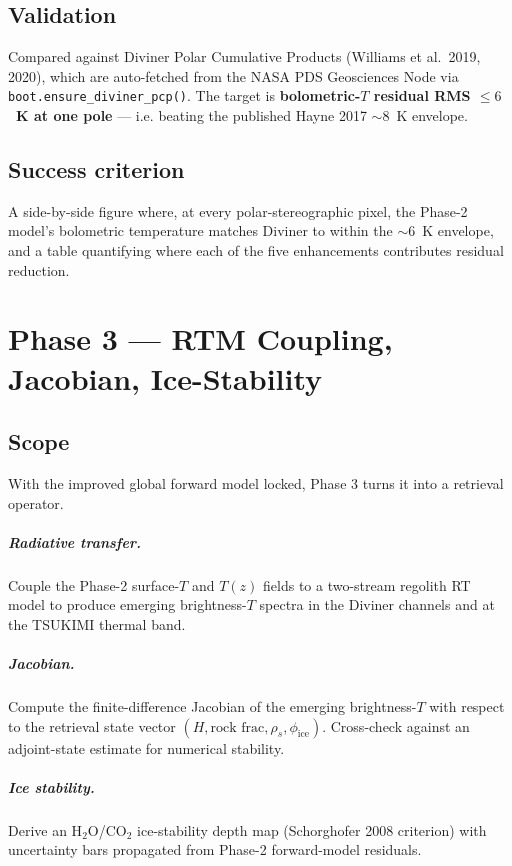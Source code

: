 \documentclass[11pt,a4paper]{book}
\begin{document}
\section{Validation}
Compared against Diviner Polar Cumulative Products (Williams
et al.\ 2019, 2020), which are auto-fetched from the NASA PDS Geosciences
Node via \texttt{boot.ensure\_diviner\_pcp()}. The target is
\textbf{bolometric-$T$ residual RMS $\le 6$~K at one pole} --- i.e.
beating the published Hayne 2017 $\sim 8$~K envelope.

\section{Success criterion}
A side-by-side figure where, at every polar-stereographic pixel, the
Phase-2 model's bolometric temperature matches Diviner to within the
$\sim 6$~K envelope, and a table quantifying where each of the five
enhancements contributes residual reduction.

\chapter{Phase 3 --- RTM Coupling, Jacobian, Ice-Stability}
\section{Scope}
With the improved global forward model locked, Phase 3 turns it into a
retrieval operator.

\paragraph{Radiative transfer.} Couple the Phase-2 surface-$T$ and
$T(z)$ fields to a two-stream regolith RT model to produce emerging
brightness-$T$ spectra in the Diviner channels and at the TSUKIMI
thermal band.

\paragraph{Jacobian.} Compute the finite-difference Jacobian of the
emerging brightness-$T$ with respect to the retrieval state vector
$(H, \text{rock frac}, \rho_s, \phi_\text{ice})$. Cross-check against
an adjoint-state estimate for numerical stability.

\paragraph{Ice stability.} Derive an H$_2$O/CO$_2$ ice-stability depth
map (Schorghofer 2008 criterion) with uncertainty bars propagated from
Phase-2 forward-model residuals.
\end{document}
